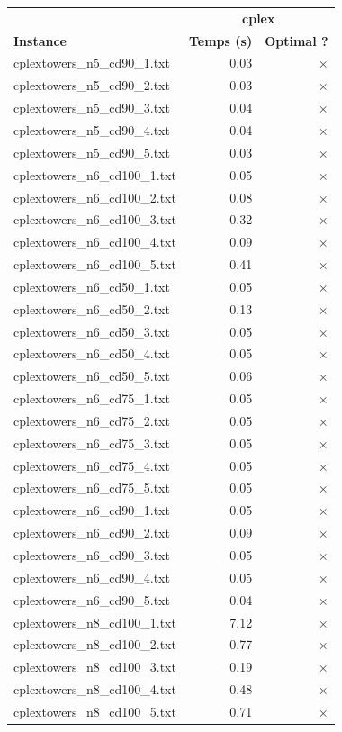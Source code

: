 \documentclass{article}
\begin{document}
\newpage
\begin{center}
\renewcommand{\arraystretch}{1.4} 
 \begin{tabular}{lrr}
	\hline
 & \multicolumn{2}{c}{\textbf{cplex}}\\
\textbf{Instance}  & \textbf{Temps (s)} & \textbf{Optimal ?} \\\hline

cplextowers\_n5\_cd90\_1.txt & 0.03 & 
$\times$
\\
cplextowers\_n5\_cd90\_2.txt & 0.03 & 
$\times$
\\
cplextowers\_n5\_cd90\_3.txt & 0.04 & 
$\times$
\\
cplextowers\_n5\_cd90\_4.txt & 0.04 & 
$\times$
\\
cplextowers\_n5\_cd90\_5.txt & 0.03 & 
$\times$
\\
cplextowers\_n6\_cd100\_1.txt & 0.05 & 
$\times$
\\
cplextowers\_n6\_cd100\_2.txt & 0.08 & 
$\times$
\\
cplextowers\_n6\_cd100\_3.txt & 0.32 & 
$\times$
\\
cplextowers\_n6\_cd100\_4.txt & 0.09 & 
$\times$
\\
cplextowers\_n6\_cd100\_5.txt & 0.41 & 
$\times$
\\
cplextowers\_n6\_cd50\_1.txt & 0.05 & 
$\times$
\\
cplextowers\_n6\_cd50\_2.txt & 0.13 & 
$\times$
\\
cplextowers\_n6\_cd50\_3.txt & 0.05 & 
$\times$
\\
cplextowers\_n6\_cd50\_4.txt & 0.05 & 
$\times$
\\
cplextowers\_n6\_cd50\_5.txt & 0.06 & 
$\times$
\\
cplextowers\_n6\_cd75\_1.txt & 0.05 & 
$\times$
\\
cplextowers\_n6\_cd75\_2.txt & 0.05 & 
$\times$
\\
cplextowers\_n6\_cd75\_3.txt & 0.05 & 
$\times$
\\
cplextowers\_n6\_cd75\_4.txt & 0.05 & 
$\times$
\\
cplextowers\_n6\_cd75\_5.txt & 0.05 & 
$\times$
\\
cplextowers\_n6\_cd90\_1.txt & 0.05 & 
$\times$
\\
cplextowers\_n6\_cd90\_2.txt & 0.09 & 
$\times$
\\
cplextowers\_n6\_cd90\_3.txt & 0.05 & 
$\times$
\\
cplextowers\_n6\_cd90\_4.txt & 0.05 & 
$\times$
\\
cplextowers\_n6\_cd90\_5.txt & 0.04 & 
$\times$
\\
cplextowers\_n8\_cd100\_1.txt & 7.12 & 
$\times$
\\
cplextowers\_n8\_cd100\_2.txt & 0.77 & 
$\times$
\\
cplextowers\_n8\_cd100\_3.txt & 0.19 & 
$\times$
\\
cplextowers\_n8\_cd100\_4.txt & 0.48 & 
$\times$
\\
cplextowers\_n8\_cd100\_5.txt & 0.71 & 
$\times$
\\
\hline\end{tabular}
\end{center}
\end{document}

